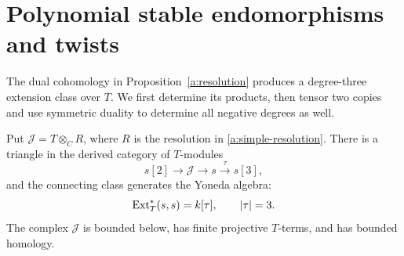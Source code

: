 \section{Polynomial stable endomorphisms and twists}
\label{e:section}

The dual cohomology in Proposition~\ref{a:resolution} produces a
degree-three extension class over \(T\).  We first determine its
products, then tensor two copies and use symmetric duality to determine
all negative degrees as well.

\begin{proposition}\label{e:polynomial}
Put \(\mathcal J=T\otimes_C R\), where \(R\) is the resolution in
\eqref{a:simple-resolution}.  There is a triangle in the derived
category of \(T\)-modules
\begin{equation}
s[2]\longrightarrow\mathcal J\longrightarrow s
 \xrightarrow{\tau}s[3],
\label{e:triangle}
\end{equation}
and the connecting class generates the Yoneda algebra:
\begin{equation}
\operatorname{Ext}_T^*(s,s)=k[\tau],\qquad |\tau|=3.
\label{e:one-polynomial}
\end{equation}
The complex \(\mathcal J\) is bounded below, has finite projective
\(T\)-terms, and has bounded homology.
\end{proposition}

